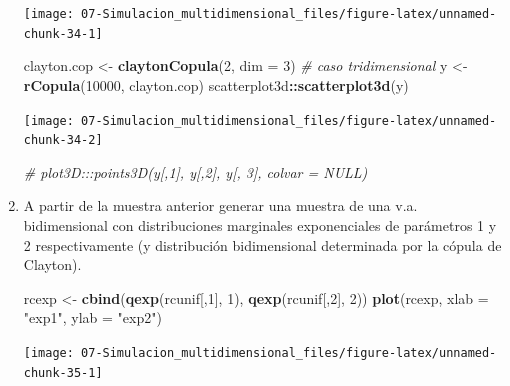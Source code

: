 \documentclass[]{book}
\newenvironment{Shaded}{\begin{snugshade}}{\end{snugshade}}
\newcommand{\KeywordTok}[1]{\textcolor[rgb]{0.13,0.29,0.53}{\textbf{#1}}}
\newcommand{\DataTypeTok}[1]{\textcolor[rgb]{0.13,0.29,0.53}{#1}}
\newcommand{\DecValTok}[1]{\textcolor[rgb]{0.00,0.00,0.81}{#1}}
\newcommand{\StringTok}[1]{\textcolor[rgb]{0.31,0.60,0.02}{#1}}
\newcommand{\CommentTok}[1]{\textcolor[rgb]{0.56,0.35,0.01}{\textit{#1}}}
\newcommand{\OperatorTok}[1]{\textcolor[rgb]{0.81,0.36,0.00}{\textbf{#1}}}
\newcommand{\NormalTok}[1]{#1}
\theoremstyle{definition}
\theoremstyle{definition}
\theoremstyle{definition}
\theoremstyle{remark}
\begin{document}
\begin{enumerate}
  \begin{center}\texttt{[image: 07-Simulacion\_multidimensional\_files/figure-latex/unnamed-chunk-34-1]} \end{center}

\begin{Shaded}
\begin{Highlighting}[]
\NormalTok{clayton.cop <-}\StringTok{ }\KeywordTok{claytonCopula}\NormalTok{(}\DecValTok{2}\NormalTok{, }\DataTypeTok{dim =} \DecValTok{3}\NormalTok{) }\CommentTok{# caso tridimensional}
\NormalTok{y <-}\StringTok{ }\KeywordTok{rCopula}\NormalTok{(}\DecValTok{10000}\NormalTok{, clayton.cop)}
\NormalTok{scatterplot3d}\OperatorTok{::}\KeywordTok{scatterplot3d}\NormalTok{(y)}
\end{Highlighting}
\end{Shaded}

  \begin{center}\texttt{[image: 07-Simulacion\_multidimensional\_files/figure-latex/unnamed-chunk-34-2]} \end{center}

\begin{Shaded}
\begin{Highlighting}[]
\CommentTok{# plot3D:::points3D(y[,1], y[,2], y[, 3], colvar = NULL) }
\end{Highlighting}
\end{Shaded}
\item
  A partir de la muestra anterior generar una muestra de una v.a.
  bidimensional con distribuciones marginales exponenciales de
  parámetros 1 y 2 respectivamente (y distribución bidimensional
  determinada por la cópula de Clayton).

\begin{Shaded}
\begin{Highlighting}[]
\NormalTok{rcexp <-}\StringTok{ }\KeywordTok{cbind}\NormalTok{(}\KeywordTok{qexp}\NormalTok{(rcunif[,}\DecValTok{1}\NormalTok{], }\DecValTok{1}\NormalTok{), }\KeywordTok{qexp}\NormalTok{(rcunif[,}\DecValTok{2}\NormalTok{], }\DecValTok{2}\NormalTok{))}
\KeywordTok{plot}\NormalTok{(rcexp, }\DataTypeTok{xlab =} \StringTok{"exp1"}\NormalTok{, }\DataTypeTok{ylab =} \StringTok{"exp2"}\NormalTok{)}
\end{Highlighting}
\end{Shaded}

  \begin{center}\texttt{[image: 07-Simulacion\_multidimensional\_files/figure-latex/unnamed-chunk-35-1]} \end{center}


\end{enumerate}
\end{document}
